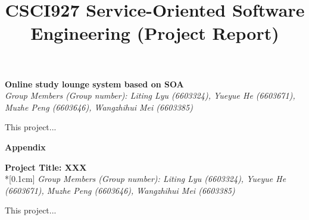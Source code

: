 \documentclass[runningheads]{llncs}
\begin{document}
\title{\large{CSCI927 Service-Oriented Software Engineering (Project Report)}}
\author{}
\institute{}
\maketitle
\vspace{-1cm}



\begin{center}
\Large{\textbf{Online study lounge system based on SOA}} \\ %
\vspace{0.2cm}
\large{\emph{Group Members (Group number): Liting Lyu (6603324), Yueyue  He (6603671), Muzhe Peng (6603646), Wangzhihui Mei (6603385)}} \\%
\vspace{0.3cm}
\end{center}

\noindent This project...


\clearpage
\begin{flushleft}
\huge{\textbf{Appendix}}
\end{flushleft}
\begin{center}
\Large{\textbf{Project Title:  XXX }} \\*[0.1cm]%
\large{\emph{Group Members (Group number): Liting Lyu (6603324), Yueyue  He (6603671), Muzhe Peng (6603646), Wangzhihui Mei (6603385)}} %
\end{center}


\noindent This project...

    
\end{document}
